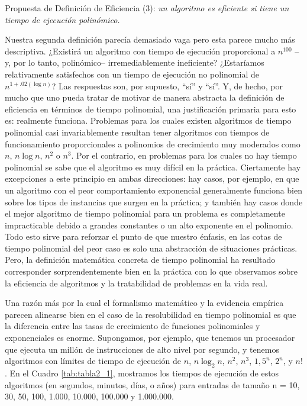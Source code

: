 \documentclass[a4paper, 12pt]{book}
\begin{document}
\vspace{18pt}\noindent
\colorbox{mygray}{\parbox{0.99\textwidth}{
Propuesta de Definición de Eficiencia (3): \textit{un algoritmo es eficiente si tiene un tiempo de ejecución polinómico.}}}
\vspace{18pt}

Nuestra segunda definición parecía demasiado vaga pero esta parece mucho más descriptiva. ¿Existirá un algoritmo con tiempo de ejecución proporcional a $n^{100}$ --y, por lo tanto, polinómico-- irremediablemente ineficiente? ¿Estaríamos relativamente satisfechos con un tiempo de ejecución no polinomial de $n^{1+.02(\log n)}$? Las respuestas son, por supuesto, ``sí'' y ``sí''. Y, de hecho, por mucho que uno pueda tratar de motivar de manera abstracta la definición de eficiencia en términos de tiempo polinomial, una justificación primaria para esto es: realmente funciona. Problemas para los cuales existen algoritmos de tiempo polinomial casi invariablemente resultan tener algoritmos con tiempos de funcionamiento proporcionales a polinomios de crecimiento muy moderados como $n$, $n \log n$, $n^2$ o $n^3$. Por el contrario, en problemas para los cuales no hay tiempo polinomial se sabe que el algoritmo es muy difícil en la práctica. Ciertamente hay excepciones a este principio en ambas direcciones: hay casos, por ejemplo, en que un algoritmo con el peor comportamiento exponencial generalmente funciona bien sobre los tipos de instancias que surgen en la práctica; y también hay casos donde el mejor algoritmo de tiempo polinomial para un problema es completamente impracticable debido a grandes constantes o un alto exponente en el polinomio. Todo esto sirve para reforzar el punto de que nuestro énfasis, en las cotas de tiempo polinomial del peor caso es solo una abstracción de situaciones prácticas. Pero, la definición matemática concreta de tiempo polinomial ha resultado corresponder sorprendentemente bien en la práctica con lo que observamos sobre la eficiencia de algoritmos y la tratabilidad de problemas en la vida real.

Una razón más por la cual el formalismo matemático y la evidencia empírica parecen alinearse bien en el caso de la resolubilidad en tiempo polinomial es que la diferencia entre las tasas de crecimiento de funciones polinomiales y exponenciales es enorme.
Supongamos, por ejemplo, que tenemos un procesador que ejecuta un millón de instrucciones de alto nivel por segundo, y tenemos algoritmos con límites de tiempo de ejecución de $n$, $n \log_2 n$, $n^2$, $n^3$, $1,5^n$, $2^n$, y $n!$. En el Cuadro \ref{tab:tabla2_1}, mostramos los tiempos de ejecución de estos algoritmos (en segundos, minutos, días, o años) para entradas de tamaño n = 10, 30, 50, 100, 1.000, 10.000, 100.000 y 1.000.000. 
\end{document}
